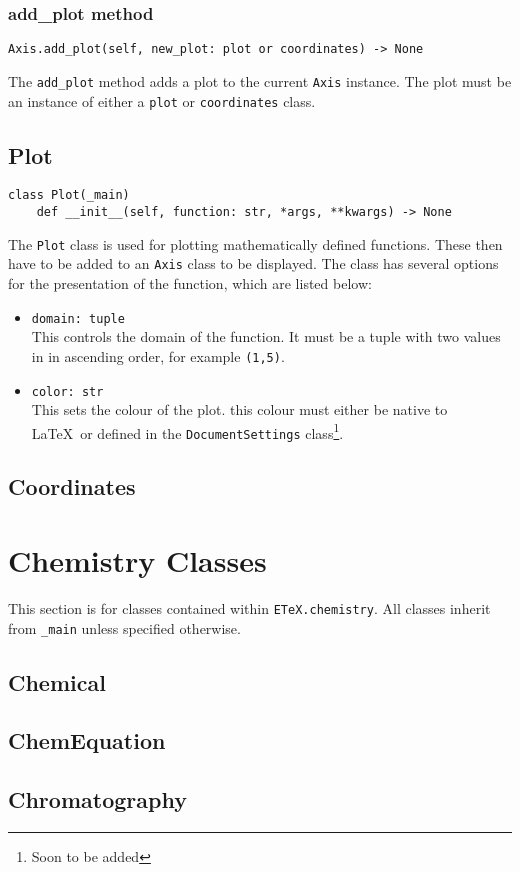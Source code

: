\documentclass{article}
\begin{document}
\subsubsection{add\_plot method}\label{subsubsec:add_plot_method}
\begin{verbatim}
Axis.add_plot(self, new_plot: plot or coordinates) -> None
\end{verbatim}
The \verb|add_plot| method adds a plot to the current \verb|Axis| instance. The plot must be an instance of either a \verb|plot| or \verb|coordinates| class.
\subsection{Plot}\label{subsec:plot}
\begin{verbatim}
class Plot(_main)
	def __init__(self, function: str, *args, **kwargs) -> None
\end{verbatim}
The \verb|Plot| class is used for plotting mathematically defined functions. These then have to be added to an \verb|Axis| class to be displayed. The class has several options for the presentation of the function, which are listed below:\begin{itemize}
\item \verb|domain: tuple|\\This controls the domain of the function. It must be a tuple with two values in in ascending order, for example \verb|(1,5)|.
\item \verb|color: str|\\This sets the colour of the plot. this colour must either be native to \LaTeX\ or defined in the \verb|DocumentSettings| class\footnote{Soon to be added}.
\end{itemize}

\subsection{Coordinates}\label{subsec:coordinates}

\section{Chemistry Classes}\label{sec:chemistry_classes}
This section is for classes contained within \verb|ETeX.chemistry|. All classes inherit from \verb|_main| unless specified otherwise.
\subsection{Chemical}\label{subsec:chemical}

\subsection{ChemEquation}\label{subsec:chemequation}

\subsection{Chromatography}\label{subsec:chromatography}
\end{document}
